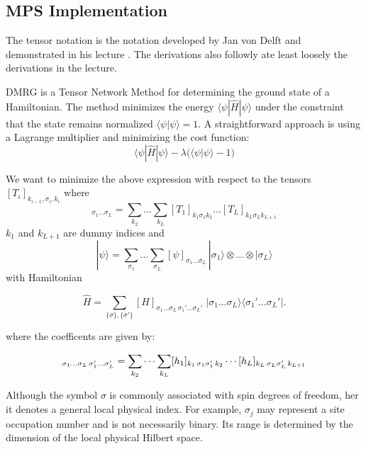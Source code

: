 \subsection{MPS Implementation}

The tensor notation is the notation developed by Jan von Delft and demonstrated in his lecture \cite{tensornetworks}.
The derivations also followly ate least loosely the derivations in the lecture.

DMRG is a Tensor Network Method for determining the ground state of a Hamiltonian. 
The method minimizes the energy $\langle \psi | \hat{H} | \psi \rangle$ under the constraint that the state remains normalized $\langle \psi | \psi \rangle = 1$. 
A straightforward approach is using a Lagrange multiplier and minimizing the cost function:
\begin{equation}
    \langle \psi | \hat{H} | \psi \rangle - \lambda\big( \langle \psi | \psi \rangle - 1 \big) \label{eq:DMRG-cost}
\end{equation}

We want to minimize the above expression with respect to the tensors $[T_i]_{k_{i-1},\sigma_i,k_i}$ where
\begin{equation*}
    [\psi]_{\sigma_1 \dots \sigma_L} = \sum_{k_2} \dots \sum_{k_{L}} [T_1]_{k_1 \sigma_1 k_2} \dots [T_L]_{k_L \sigma_L k_{L+1}}
\end{equation*}
$k_1$ and $k_{L+1}$ are dummy indices and
\begin{equation*}
    |\psi\rangle = \sum_{\sigma_1} \dots \sum_{\sigma_L} [\psi]_{\sigma_1 \dots \sigma_L}\, |\sigma_1\rangle \otimes \dots \otimes |\sigma_L\rangle
\end{equation*}
with Hamiltonian

\begin{equation*}
\hat H = \sum_{\{\sigma\},\{\sigma'\}}
   [H]_{\sigma_1\dots\sigma_L\,\sigma_1'\dots\sigma_L'}\;
   |\sigma_1\dots\sigma_L\rangle\langle\sigma_1'\dots\sigma_L'|.
\end{equation*}

where the coefficents are given by:

\begin{equation*}
[H]_{\sigma_1\dots\sigma_L\,\sigma_1'\dots\sigma_L'} = \sum_{k_2}\cdots\sum_{k_L}
   [h_1]_{k_1\,\sigma_1\sigma_1'\,k_2}\cdots
   [h_L]_{k_L\,\sigma_L\sigma_L'\,k_{L+1}} \\[4pt]
\end{equation*}

Although the symbol $\sigma$ is commonly associated with spin degrees of freedom, her it denotes a general local physical index. 
For example, $\sigma_j$ may represent a site occupation number and is not necessarily binary. Its range is determined by the
dimension of the local physical Hilbert space.

